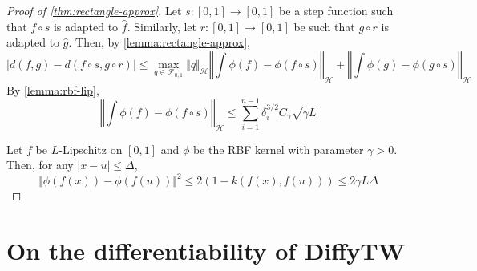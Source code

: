 \begin{proof}[Proof of \cref{thm:rectangle-approx}]
Let $s:[0,1] \to [0,1]$ be a step function such that $f\circ s$ is adapted to $\hat f$. Similarly, let $r:[0,1]\to[0,1]$ be such that $g\circ r$ is adapted to $\hat g$. Then, by \cref{lemma:rectangle-approx},
\begin{equation}
    \vert d(f, g) - d(f \circ s, g\circ r) \vert \leq \max_{q\in\mathcal F_{0,1}}\Vert q \Vert_\mathcal H \left\Vert \int \phi(f) - \phi(f\circ s)\right\Vert_{\mathcal H} + \left\Vert \int \phi(g)- \phi(g\circ s)\right\Vert_\mathcal H
\end{equation}
By \cref{lemma:rbf-lip},
\begin{equation}
\left\Vert \int \phi(f) - \phi(f\circ s)\right\Vert_{\mathcal H} \leq \sum_{i=1}^{n-1} \delta_i^{3/2}C_\gamma\sqrt{\gamma L}
\end{equation}





Let $f$ be $L$-Lipschitz on $[0,1]$ and $\phi$ be the RBF kernel with parameter $\gamma > 0$.
Then, for any $\vert x - u \vert \leq \Delta$,
\begin{equation}
    \Vert \phi(f(x)) - \phi(f(u)) \Vert^2 \leq 2\left(1 - k(f(x), f(u))\right) \leq 2 \gamma L \Delta
\end{equation}
\end{proof}

\section{On the differentiability of DiffyTW}


